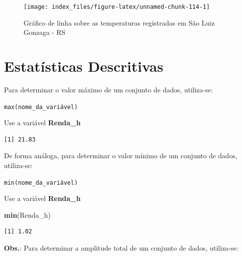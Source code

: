 \documentclass[12pt,brazil,oneside]{book}
\newenvironment{Shaded}{\begin{snugshade}}{\end{snugshade}}
\newcommand{\CommentTok}[1]{\textcolor[rgb]{0.56,0.35,0.01}{\textit{#1}}}
\newcommand{\KeywordTok}[1]{\textcolor[rgb]{0.13,0.29,0.53}{\textbf{#1}}}
\newcommand{\NormalTok}[1]{#1}
\newcommand{\OperatorTok}[1]{\textcolor[rgb]{0.81,0.36,0.00}{\textbf{#1}}}
\begin{document}
\begin{figure}[H]

{\centering \texttt{[image: index\_files/figure-latex/unnamed-chunk-114-1]} 

}

\caption{Gráfico de linha sobre as temperaturas registradas em São Luiz Gonzaga - RS}\label{fig:unnamed-chunk-114}
\end{figure}

\hypertarget{estatisticas-descritivas}{%
\section{Estatísticas Descritivas}\label{estatisticas-descritivas}}

Para determinar o valor máximo de um conjunto de dados, utiliza-se:

\texttt{max(nome\_da\_variável)}

Use a variável \textbf{Renda\_h}

\begin{Shaded}
\end{Shaded}

\begin{verbatim}
[1] 21.83
\end{verbatim}

De forma análoga, para determinar o valor mínimo de um conjunto de dados, utiliza-se:

\texttt{min(nome\_da\_variável)}

Use a variável \textbf{Renda\_h}

\begin{Shaded}
\begin{Highlighting}[]
\KeywordTok{min}\NormalTok{(Renda_h)}
\end{Highlighting}
\end{Shaded}

\begin{verbatim}
[1] 1.02
\end{verbatim}

\textbf{Obs.}: Para determinar a amplitude total de um conjunto de dados, utiliza-se:
\end{document}
